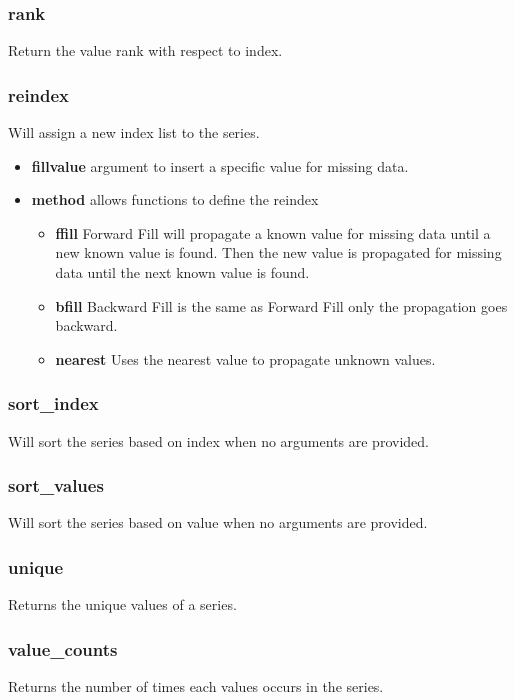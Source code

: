 \subsubsection{rank}
Return the value rank with respect to index.

\subsubsection{reindex}
Will assign a new index list to the series.
  \begin{itemize}

    \item \textbf{fill\textunderscore value} argument to insert a specific
      value for missing data.

    \item \textbf{method} allows functions to define the reindex
      \begin{itemize}

        \item \textbf{ffill} Forward Fill will propagate a known value for
          missing data until a new known value is found.  Then the new value
          is propagated for missing data until the next known value is found.

        \item \textbf{bfill} Backward Fill is the same as Forward Fill only
          the propagation goes backward.

        \item \textbf{nearest} Uses the nearest value to propagate unknown
          values.
      \end{itemize}
  \end{itemize}

\subsubsection{sort\_index}
Will sort the series based on index when no arguments are provided.

\subsubsection{sort\_values}
Will sort the series based on value when no arguments are provided.

\subsubsection{unique}
Returns the unique values of a series.

\subsubsection{value\_counts}
Returns the number of times each values occurs in the series.

